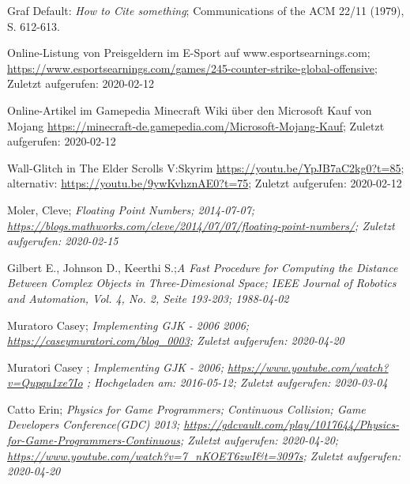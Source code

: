         Graf Default: {\sl How to Cite something}; 
        Communications of the ACM 22/11 (1979), S. 612-613.

		Online-Listung von Preisgeldern im E-Sport auf www.esportsearnings.com;
		\url{https://www.esportsearnings.com/games/245-counter-strike-global-offensive}; Zuletzt aufgerufen: 2020-02-12

		Online-Artikel im Gamepedia Minecraft Wiki über den Microsoft Kauf von Mojang
		\url{https://minecraft-de.gamepedia.com/Microsoft-Mojang-Kauf}; Zuletzt aufgerufen: 2020-02-12

		Wall-Glitch in The Elder Scrolls V:Skyrim
		\url{https://youtu.be/YpJB7aC2kg0?t=85}; 
		alternativ: \url{https://youtu.be/9ywKvhznAE0?t=75};
		Zuletzt aufgerufen: 2020-02-12

		Moler, Cleve; \sl{Floating Point Numbers}; 2014-07-07;
		\url{https://blogs.mathworks.com/cleve/2014/07/07/floating-point-numbers/};
		Zuletzt aufgerufen: 2020-02-15

		Gilbert E., Johnson D., Keerthi S.;\sl{A Fast Procedure for Computing the Distance Between Complex Objects in Three-Dimesional Space};
		IEEE Journal of Robotics and Automation, Vol. 4, No. 2, Seite 193-203; 1988-04-02

		Muratoro Casey; \sl{Implementing GJK - 2006}
		2006;
		\url{https://caseymuratori.com/blog_0003}; Zuletzt aufgerufen: 2020-04-20

		Muratori Casey ; \sl{Implementing GJK - 2006};
		\url{https://www.youtube.com/watch?v=Qupqu1xe7Io} ; Hochgeladen am: 2016-05-12; Zuletzt aufgerufen: 2020-03-04

		Catto Erin;  \sl{Physics for Game Programmers; Continuous Collision};
		Game Developers Conference(GDC) 2013;
		\url{https://gdcvault.com/play/1017644/Physics-for-Game-Programmers-Continuous}; Zuletzt aufgerufen: 2020-04-20;
		\url{https://www.youtube.com/watch?v=7_nKOET6zwI&t=3097s}; Zuletzt aufgerufen: 2020-04-20
